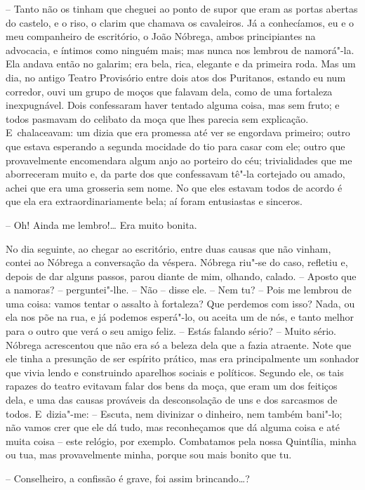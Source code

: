 -- Tanto não os tinham que cheguei ao ponto de supor que eram as portas
abertas do castelo, e o riso, o clarim que chamava os cavaleiros. Já a
conhecíamos, eu e o meu companheiro de escritório, o João Nóbrega, ambos
principiantes na advocacia, e íntimos como ninguém mais; mas nunca nos
lembrou de namorá"-la. Ela andava então no galarim; era bela, rica,
elegante e da primeira roda. Mas um dia, no antigo Teatro Provisório
entre dois atos dos Puritanos, estando eu num corredor, ouvi um grupo de
moços que falavam dela, como de uma fortaleza inexpugnável. Dois
confessaram haver tentado alguma coisa, mas sem fruto; e todos pasmavam
do celibato da moça que lhes parecia sem explicação. E~chalaceavam: um
dizia que era promessa até ver se engordava primeiro; outro que estava
esperando a segunda mocidade do tio para casar com ele; outro que
provavelmente encomendara algum anjo ao porteiro do céu; trivialidades
que me aborreceram muito e, da parte dos que confessavam tê"-la cortejado
ou amado, achei que era uma grosseria sem nome. No que eles estavam
todos de acordo é que ela era extraordinariamente bela; aí foram
entusiastas e sinceros.

-- Oh! Ainda me lembro!\ldots{} Era muito bonita.

No dia seguinte, ao chegar ao escritório, entre duas causas que não
vinham, contei ao Nóbrega a conversação da véspera. Nóbrega riu"-se do
caso, refletiu e, depois de dar alguns passos, parou diante de mim,
olhando, calado. -- Aposto que a namoras? ­-- perguntei"-lhe. -- Não --
disse ele. -- Nem tu? -- Pois me lembrou de uma coisa: vamos tentar o
assalto à fortaleza? Que perdemos com isso? Nada, ou ela nos põe na rua,
e já podemos esperá"-lo, ou aceita um de nós, e tanto melhor para o outro
que verá o seu amigo feliz. -- Estás falando sério? -- Muito sério.
Nóbrega acrescentou que não era só a beleza dela que a fazia atraente.
Note que ele tinha a presunção de ser espírito prático, mas era
principalmente um sonhador que vivia lendo e construindo aparelhos
sociais e políticos. Segundo ele, os tais rapazes do teatro evitavam
falar dos bens da moça, que eram um dos feitiços dela, e uma das causas
prováveis da desconsolação de uns e dos sarcasmos de todos. E~dizia"-me:
-- Escuta, nem divinizar o dinheiro, nem também bani"-lo; não vamos crer
que ele dá tudo, mas reconheçamos que dá alguma coisa e até muita coisa
-- este relógio, por exemplo. Combatamos pela nossa Quintília, minha ou
tua, mas provavelmente minha, porque sou mais bonito que tu.

-- Conselheiro, a confissão é grave, foi assim brincando\ldots{}?

